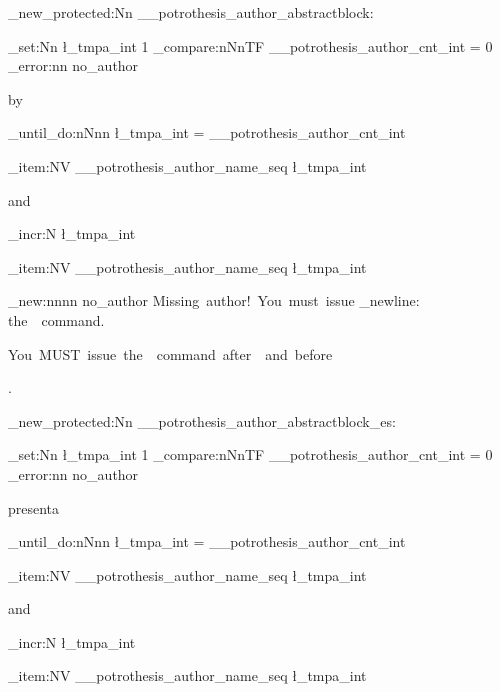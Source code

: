 \cs_new_protected:Nn \__potrothesis_author_abstractblock: {
	\int_set:Nn \l_tmpa_int {1} %
	\int_compare:nNnTF { \g__potrothesis_author_cnt_int } = {0} {
		\msg_error:nn { \ClassName } { no_author }
		}	
		{by\par
		\int_until_do:nNnn { \l_tmpa_int } = { \g__potrothesis_author_cnt_int } {
			\seq_item:NV \g__potrothesis_author_name_seq \l_tmpa_int
			\par and\par
			\int_incr:N \l_tmpa_int
		}
		\seq_item:NV \g__potrothesis_author_name_seq \l_tmpa_int 
    }
}
\msg_new:nnnn { \ClassName } { no_author }
		{ Missing~author!~You~must~issue \iow_newline: the~~command. }{
		You~MUST~issue~the~~command~after~\string~and~before~\string\maketitle. }

\cs_new_protected:Nn \__potrothesis_author_abstractblock_es: {
	\int_set:Nn \l_tmpa_int {1} %
	\int_compare:nNnTF { \g__potrothesis_author_cnt_int } = {0} {
		\msg_error:nn { \ClassName } { no_author }
		}	
		{presenta\par
		\int_until_do:nNnn { \l_tmpa_int } = { \g__potrothesis_author_cnt_int } {
			\seq_item:NV \g__potrothesis_author_name_seq \l_tmpa_int
			\par and\par
			\int_incr:N \l_tmpa_int
		}
		\seq_item:NV \g__potrothesis_author_name_seq \l_tmpa_int 
    }
}
\ExplSyntaxOff